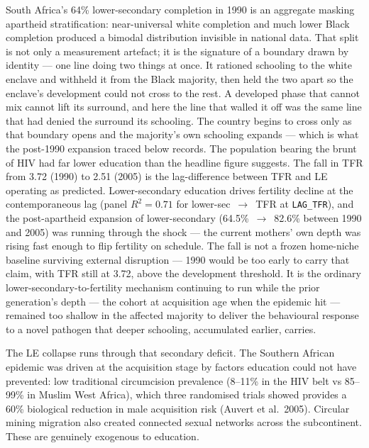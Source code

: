 \documentclass[12pt,letterpaper]{article}
\begin{document}
South Africa's 64\% lower-secondary completion in 1990 is an aggregate
masking apartheid stratification: near-universal white completion and
much lower Black completion produced a bimodal distribution invisible
in national data. That split is not only a measurement artefact; it
is the signature of a boundary drawn by identity --- one line doing
two things at once. It rationed schooling to the white enclave and
withheld it from the Black majority, then held the two apart so the
enclave's development could not cross to the rest. A developed phase
that cannot mix cannot lift its surround, and here the line that
walled it off was the same line that had denied the surround its
schooling. The country begins to cross only as that boundary opens and
the majority's own schooling expands --- which is what the post-1990
expansion traced below records. The population bearing the brunt of HIV had far
lower education than the headline figure suggests. The fall in TFR
from 3.72 (1990) to 2.51 (2005) is the lag-difference between TFR
and LE operating as predicted. Lower-secondary education drives
fertility decline at the contemporaneous lag (panel $R^2 = 0.71$ for
lower-sec~$\to$~TFR at \texttt{LAG\_TFR}), and the post-apartheid expansion of
lower-secondary (64.5\%~$\to$~82.6\% between 1990 and 2005) was
running through the shock --- the current mothers' own depth was
rising fast enough to flip fertility on schedule. The fall is
not a frozen home-niche baseline surviving external disruption ---
1990 would be too early to carry that claim, with TFR still at 3.72,
above the development threshold. It is the ordinary
lower-sec\-ondary-to-fertility mechanism continuing to run while the
prior generation's depth --- the cohort at acquisition age when the
epidemic hit --- remained too shallow in the affected majority to
deliver the behavioural response to a novel pathogen that deeper
schooling, accumulated earlier, carries.

The LE collapse runs through that secondary deficit. The Southern
African epidemic was driven at the acquisition stage by factors
education could not have prevented: low traditional circumcision
prevalence (8--11\% in the HIV belt vs 85--99\% in Muslim West
Africa), which three randomised trials showed provides a 60\%
biological reduction in male acquisition risk (Auvert et al.~2005).
Circular mining migration also created connected sexual networks
across the subcontinent. These are genuinely exogenous to education.
\end{document}
